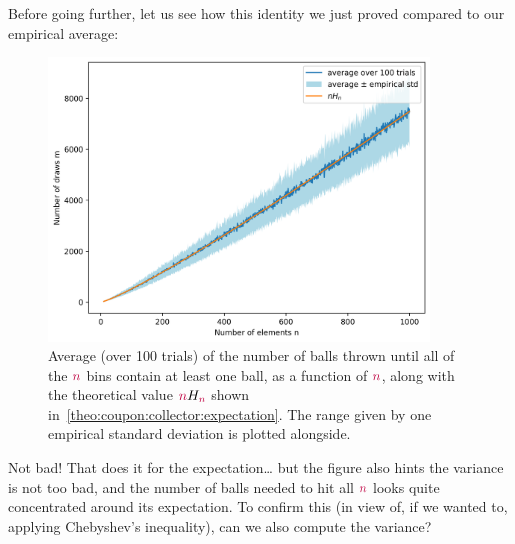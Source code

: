 Before going further, let us see how this identity we just proved compared to our empirical average:
\begin{figure}[htbp]\centering
    \label{fig:coverage:2}
\includegraphics[width=0.9\textwidth]{figures/fig-coverage2.png}
\caption{Average (over 100 trials) of the number of balls thrown until all of the $\textcolor{purple}{n}$ bins contain at least one ball, as a function of $\textcolor{purple}{n}$, along with the theoretical value $\textcolor{purple}{n} H_{\textcolor{purple}{n}}$ shown in~\cref{theo:coupon:collector:expectation}. The range given by one empirical standard deviation is plotted alongside.}
\end{figure}

Not bad! That does it for the expectation\dots{} but the figure also hints the variance is not too bad, and the number of balls needed to hit all $\textcolor{purple}{n}$ looks quite concentrated around its expectation. To confirm this (in view of, if we wanted to, applying Chebyshev's inequality), can we also compute the variance?


